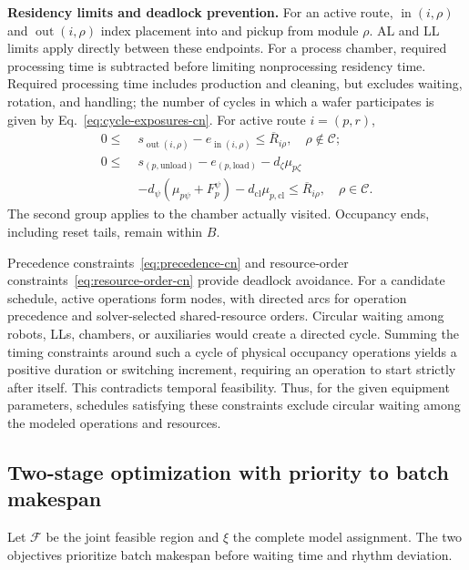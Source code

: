 \documentclass[final,5p,times,twocolumn]{elsarticle}
\begin{document}
\noindent\textbf{Residency limits and deadlock prevention.}
For an active route, $\operatorname{in}(i,\rho)$ and $\operatorname{out}(i,\rho)$ index placement into and pickup from module $\rho$. AL and LL limits apply directly between these endpoints. For a process chamber, required processing time is subtracted before limiting nonprocessing residency time. Required processing time includes production and cleaning, but excludes waiting, rotation, and handling; the number of cycles in which a wafer participates is given by Eq.~\eqref{eq:cycle-exposures-cn}. For active route $i=(p,r)$,
\begin{equation}
\begin{aligned}
0\le\;&s_{\operatorname{out}(i,\rho)}-e_{\operatorname{in}(i,\rho)}
\le\overline R_{i\rho},\quad \rho\notin\mathcal C;\\
0\le\;&s_{(p,\mathrm{unload})}-e_{(p,\mathrm{load})}
-d_\zeta\mu_{p\zeta}\\
&-d_\psi(\mu_{p\psi}+F_p^\psi)
-d_{\mathrm{cl}}\mu_{p,\mathrm{cl}}\le\overline R_{i\rho},
\quad\rho\in\mathcal C.
\end{aligned}
\label{eq:residence-cn}
\end{equation}
The second group applies to the chamber actually visited. Occupancy ends, including reset tails, remain within $B$.

Precedence constraints~\eqref{eq:precedence-cn} and resource-order constraints~\eqref{eq:resource-order-cn} provide deadlock avoidance. For a candidate schedule, active operations form nodes, with directed arcs for operation precedence and solver-selected shared-resource orders. Circular waiting among robots, LLs, chambers, or auxiliaries would create a directed cycle. Summing the timing constraints around such a cycle of physical occupancy operations yields a positive duration or switching increment, requiring an operation to start strictly after itself. This contradicts temporal feasibility. Thus, for the given equipment parameters, schedules satisfying these constraints exclude circular waiting among the modeled operations and resources.

\subsection{Two-stage optimization with priority to batch makespan}
\label{sec:model-objective-cn}
Let $\mathcal F$ be the joint feasible region and $\xi$ the complete model assignment. The two objectives prioritize batch makespan before waiting time and rhythm deviation.
\end{document}
